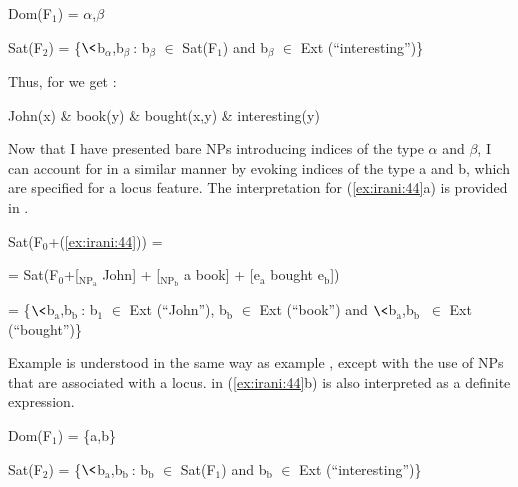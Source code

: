 \documentclass[output=paper,
modfonts
]{langscibook}
\begin{document}
\begin{exe} 

\ex \label{ex:irani:58} Dom(F$_1$) = {$\alpha$,$\beta$} \par 
Sat(F$_2$) = \{$\<$b$_{\alpha}$,b$_{\beta}\>$: b$_{\beta}$ \(\in\) Sat(F$_1$) and b$_{\beta}$ \(\in\) Ext (``interesting'')\} \par 

\end{exe}

Thus, for  we get :

\begin{exe}

\ex\label{ex:irani:59} John(x) \& book(y) \& bought(x,y) \& interesting(y)

\end{exe}

Now that I have presented bare NPs introducing indices of the type \(\alpha\) and \(\beta\), I can account for  in a similar manner by evoking indices of the type a and b, which are specified for a locus feature.  The interpretation for (\ref{ex:irani:44}a) is provided in .

\begin{exe} 

\ex\label{ex:irani:60} Sat(F$_0$+(\ref{ex:irani:44})) = \par 
= Sat(F$_0$+[$_{\text{NP}_\text{a}}$ John] + [$_{\text{NP}_\text{b}}$ a book] + [e$_\text{a}$ bought e$_\text{b}$])\par 
= \{$\<$b$_\text{a}$,b$_\text{b}\>$: b$_1$ \(\in\) Ext (``John''), b$_\text{b}$ \(\in\) Ext (``book'') and $\<$b$_\text{a}$,b$_\text{b}\>$ \(\in\) Ext \\ (``bought'')\}  

\end{exe}

Example  is understood in the same way as example , except with the use of NPs that are associated with a locus.  in (\ref{ex:irani:44}b) is also interpreted as a definite expression. 

\begin{exe}

\ex Dom(F$_1$) = \{a,b\} \par 
Sat(F$_2$) = \{$\<$b$_\text{a}$,b$_\text{b}\>$: b$_\text{b}$ \(\in\) Sat(F$_1$) and b$_\text{b}$ \(\in\) Ext (``interesting'')\} \par 

\end{exe}
\end{document}

